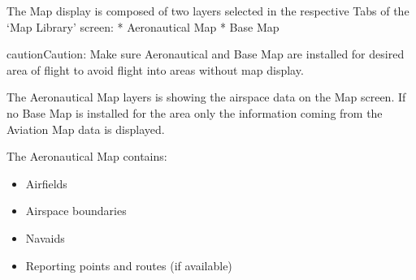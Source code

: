 \documentclass[letterpaper,10pt,english]{sphinxmanual}
\begin{document}
\sphinxAtStartPar
The Map display is composed of two layers selected in the respective Tabs of the ‘Map Library’ screen:
* Aeronautical Map
* Base Map

\begin{sphinxadmonition}{caution}{Caution:}
\sphinxAtStartPar
Make sure Aeronautical and Base Map are installed for desired area of flight to avoid flight into areas without map display.
\end{sphinxadmonition}

\sphinxAtStartPar
{}

\sphinxAtStartPar
The Aeronautical Map layers is showing the airspace data on the Map screen. If no Base Map is installed for the area only the information coming from the Aviation Map data is displayed.

\sphinxAtStartPar
The Aeronautical Map contains:
\begin{itemize}
\item {} 
\sphinxAtStartPar
Airfields

\item {} 
\sphinxAtStartPar
Airspace boundaries

\item {} 
\sphinxAtStartPar
Navaids

\item {} 
\sphinxAtStartPar
Reporting points and routes (if available)

\end{itemize}
\end{document}
